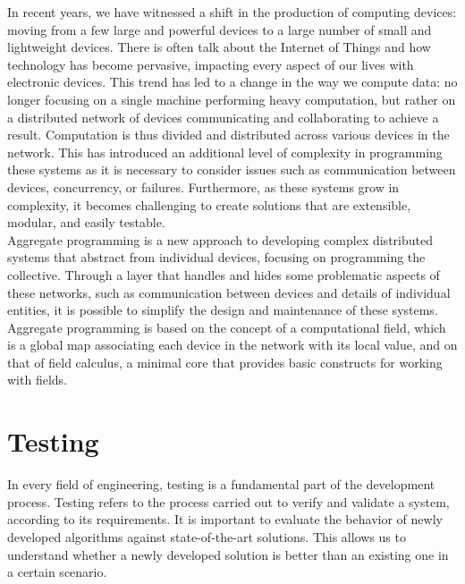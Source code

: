 \documentclass[12pt,a4paper,openright,twoside]{book}
\begin{document}
In recent years, we have witnessed a shift in the production of computing devices: moving from a few large and powerful devices to a large number of small and lightweight devices. 
There is often talk about the Internet of Things and how technology has become pervasive, impacting every aspect of our lives with electronic devices.
This trend has led to a change in the way we compute data: no longer focusing on a single machine performing heavy computation, but rather on a distributed network of devices communicating and collaborating to achieve a result. 
Computation is thus divided and distributed across various devices in the network. 
This has introduced an additional level of complexity in programming these systems as it is necessary to consider issues such as communication between devices, 
concurrency, or failures. Furthermore, as these systems grow in complexity, it becomes challenging to create solutions that are extensible, modular, and easily testable. \cite{DBLP:conf/ecoop/CasadeiV16} \\

Aggregate programming is a new approach to developing complex distributed systems that abstract from individual devices, focusing on programming the collective. 
Through a layer that handles and hides some problematic aspects of these networks, such as communication between devices and details of individual entities, 
it is possible to simplify the design and maintenance of these systems. \cite{DBLP:journals/computer/BealPV15, DBLP:conf/sfm/BealV16} \\

Aggregate programming is based on the concept of a computational field, which is a global map associating each device in the network with its local value, 
and on that of field calculus, a minimal core that provides basic constructs for working with fields. \cite{DBLP:journals/corr/ViroliADPB16}

\section{Testing}

In every field of engineering, testing is a fundamental part of the development process.
Testing refers to the process carried out to verify and validate a system, according to its requirements. \cite{Spillner2011}
It is important to evaluate the behavior of newly developed algorithms against state-of-the-art solutions.
This allows us to understand whether a newly developed solution is better than an existing one in a certain scenario. \\
\end{document}
